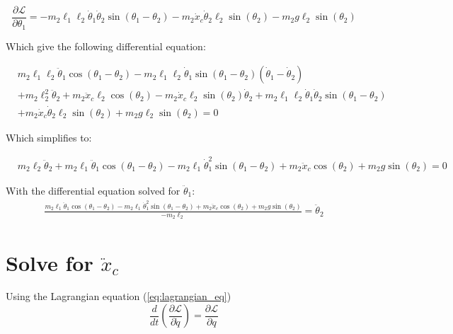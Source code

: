 \documentclass[10pt]{article}
\begin{document}
    
    \begin{equation} \label{eq: lagrange Step3}
        \frac{\partial \mathcal{L}}{\partial\theta_1} =
        -m_2 \ell_1 \ell_2 \dot \theta_1 \dot\theta_2\sin(\theta_1-\theta_2)
        -m_2\dot x_c \dot \theta_2 \ell_2 \sin(\theta_2)
        -m_2g\ell_2\sin(\theta_2)
        \end{equation}

    Which give the following differential equation:

    \begin{equation}
        \begin{aligned}
                &m_2 \ell_1 \ell_2 \ddot \theta_1 \cos(\theta_1 - \theta_2) - m_2 \ell_1 \ell_2 \dot \theta_1 \sin(\theta_1 - \theta_2)(\dot \theta_1 - \dot \theta_2)\\
                &+m_2\ell_2^2 \ddot \theta_2 + m_2 \ddot x_c \ell_2 \cos(\theta_2) - m_2 \dot x_c \ell_2 \sin(\theta_2)\dot\theta_2 + m_2 \ell_1 \ell_2 \dot \theta_1 \dot\theta_2\sin(\theta_1 - \theta_2)\\
                &+m_2\dot x_c \dot \theta_2 \ell_2 \sin(\theta_2)+m_2g\ell_2\sin(\theta_2) = 0
        \end{aligned}
    \end{equation}   


    Which simplifies to:

    \begin{equation}
        \begin{aligned}
            &m_2\ell_2 \ddot \theta_2 + m_2 \ell_1  \ddot \theta_1 \cos(\theta_1 - \theta_2) - m_2 \ell_1\dot \theta_1^2 \sin(\theta_1 - \theta_2)+ m_2 \ddot x_c  \cos(\theta_2) +m_2g\sin(\theta_2) =0
        \end{aligned}
    \end{equation}  

    With the differential equation solved for $\ddot \theta_1$:
    \begin{equation}
        \begin{aligned}
            \frac{m_2 \ell_1  \ddot \theta_1 \cos(\theta_1 - \theta_2) - m_2 \ell_1\dot \theta_1^2 \sin(\theta_1 - \theta_2)+ m_2 \ddot x_c  \cos(\theta_2) +m_2g\sin(\theta_2)}{-m_2 \ell_2} = \ddot \theta_2
        \end{aligned}
    \end{equation}  



    \pagebreak
    \section{Solve for $\ddot x_c$}
    Using the Lagrangian equation (\ref{eq:lagrangian_eq})
    \begin{equation} \label{eq:lagrangian_eq}
        \frac{d}{dt} \left(\frac{\partial \mathcal{L}}{\partial \dot q} \right) = 
        \frac{\partial \mathcal{L}}{\partial q}
    \end{equation}
\end{document}
